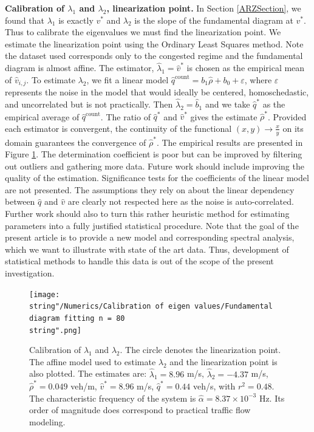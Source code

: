 \documentclass[preprint]{elsarticle}
\DeclareMathOperator{\cnt}{count}
\begin{document}
\textbf{Calibration of $\lambda_{1}$ and $\lambda_{2}$, linearization point.} In Section \ref{ARZSection}, we found that $\lambda_{1}$ is exactly $v^*$ and $\lambda_{2}$ is the slope of the fundamental diagram at $v^*$. Thus to calibrate the eigenvalues we must find the linearization point. We estimate the linearization point using the Ordinary Least Squares method. Note the dataset used corresponds only to the congested regime and the fundamental diagram is almost affine. The estimator, $\widehat{\lambda}_1=\widehat{v}^*$ is chosen as the empirical mean of $\widehat{v}_{i,j}$. To estimate $\lambda_{2}$, we fit a linear model $\widehat{q}^{\text{count}}=b_{1}\widehat{\rho}+b_{0}+\varepsilon$, where $\varepsilon$
represents the noise in the model that would ideally be centered,
homoschedastic, and uncorrelated but is not practically. Then $\widehat{\lambda}_{2}=\widehat{b}_{1}$ and we take $\widehat{q}^*$ as the empirical average of $\widehat{q}^{\cnt}$. The ratio of $\widehat{q}^*$ and $\widehat{v}^*$ gives the estimate $\widehat{\rho}^*$.
Provided each estimator is convergent, the continuity of the functional
$\left(x,y\right)\rightarrow\frac{x}{y}$ on its domain guarantees the convergence of $\widehat{\rho}^*$. The empirical results are presented in Figure \ref{fig:Calibration-of-eigen-values}. The determination coefficient is poor but can be improved by filtering out outliers and gathering more data. Future work should include improving the quality of the estimation. Significance tests for the coefficients of the linear model are not presented. The assumptions they rely on about
the linear dependency between $\widehat{q}$ and $\widehat{v}$ are clearly
not respected here as the noise is auto-correlated. Further work should also to turn this rather heuristic method for estimating parameters
into a fully justified statistical procedure. Note that the goal of the present article is to provide a new model and corresponding spectral analysis, which we want to illustrate with state of the art data. Thus, development of statistical methods to handle this data is out of the scope of the present investigation.

\begin{figure}[H]
\centering
\texttt{[image: \\string"/Numerics/Calibration of eigen values/Fundamental diagram fitting n = 80\\string".png]}
\protect\caption{Calibration of $\lambda_{1}$ and $\lambda_{2}$. The circle denotes the linearization point. The affine model used to estimate $\lambda_{2}$ and the linearization point is also plotted. The estimates are: $\widehat{\lambda}_{1}=8.96$ m/s, $\widehat{\lambda}_{2}=-4.37$ m/s, $\widehat{\rho}^{*}=0.049$ veh/m, $\widehat{v}^{*}=8.96$ m/s, $\widehat{q}^{*}=0.44$ veh/s, with $r^{2}=0.48$. The characteristic frequency of the system is $\widehat{\alpha} = 8.37\times10^{-3}$ Hz. Its order of magnitude does correspond to practical traffic flow modeling.}
\label{fig:Calibration-of-eigen-values}
\end{figure}
\end{document}
